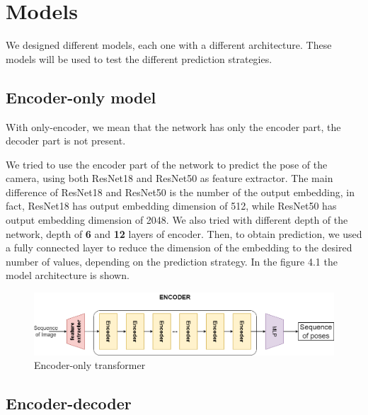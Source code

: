 \section{Models}\label{sec:exp-models}
We designed different models, each one with a different architecture.
These models will be used to test the different prediction strategies.
\subsection{Encoder-only model}\label{subsec:encoder-only-model}
With only-encoder, we mean that the network has only the encoder part, the decoder part is not present.

We tried to use the encoder part of the network to predict the pose of the camera, using both ResNet18 and ResNet50 as feature extractor.
The main difference of ResNet18 and ResNet50 is the number of the output embedding, in fact, ResNet18 has output embedding dimension of 512, while ResNet50 has output embedding dimension of 2048.
We also tried with different depth of the network, depth of \textbf{6} and \textbf{12} layers of encoder.
Then, to obtain prediction, we used a fully connected layer to reduce the dimension of the embedding to the desired number of values, depending on the prediction strategy.
In the figure 4.1 the model architecture is shown.
\begin{figure}[H]
    \centering
    \includegraphics[width=\textwidth]{images/4_1_encoder_only}
    \caption{Encoder-only transformer}\label{fig:figure-encoder-only-transformer}
\end{figure}

\subsection{Encoder-decoder}\label{subsec:encoder-decoder}

